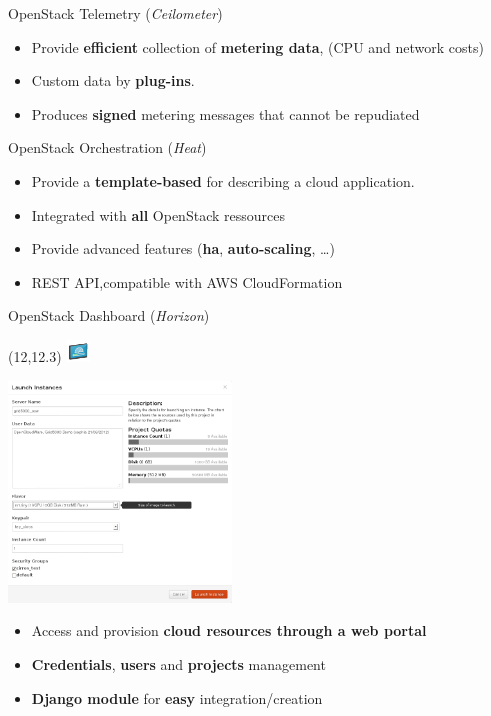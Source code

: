\begin{frame}{OpenStack Telemetry (\textsl{Ceilometer})}
  \begin{itemize}
    \item Provide \textbf{efficient} collection of \textbf{metering data}, (CPU and network costs)
      \medskip
    \item Custom data by \textbf{plug-ins}.
      \medskip
    \item Produces \textbf{signed} metering messages that cannot be repudiated
  \end{itemize}
\end{frame}

\begin{frame}{OpenStack Orchestration (\textsl{Heat})}
  \begin{itemize}
    \item Provide a \textbf{template-based} for describing a cloud application.
      \medskip
    \item Integrated with \textbf{all} OpenStack ressources
      \medskip
    \item Provide advanced features (\textbf{ha}, \textbf{auto-scaling}, …)
      \medskip
    \item REST API,compatible with AWS CloudFormation
  \end{itemize}
\end{frame}

\begin{frame}{OpenStack Dashboard (\textsl{Horizon})}
  \begin{textblock}{}(12,12.3)
    \includegraphics[width=1.7em]{img/dashboard}
  \end{textblock}
  \begin{table}[t]
    \includegraphics[width=16em]{img/dashboard_ocw}
  \end{table}
    \begin{itemize}
      \item Access and provision \textbf{cloud resources through a web portal}
      \item \textbf{Credentials}, \textbf{users} and \textbf{projects} management
      \item \textbf{Django module} for \textbf{easy} integration/creation
    \end{itemize}
\end{frame}
